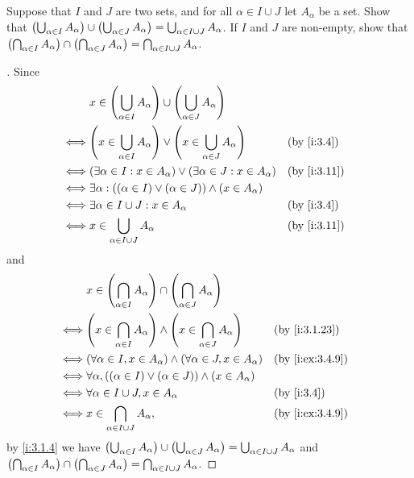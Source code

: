 \begin{ex}\label{i:ex:3.4.10}
  Suppose that \(I\) and \(J\) are two sets, and for all \(\alpha \in I \cup J\) let \(A_\alpha\) be a set.
  Show that \(\left\lparen\bigcup_{\alpha \in I} A_\alpha\right\rparen \cup \left\lparen\bigcup_{\alpha \in J} A_\alpha\right\rparen = \bigcup_{\alpha \in I \cup J} A_\alpha\).
  If \(I\) and \(J\) are non-empty, show that \(\left\lparen\bigcap_{\alpha \in I} A_\alpha\right\rparen \cap \left\lparen\bigcap_{\alpha \in J} A_\alpha\right\rparen = \bigcap_{\alpha \in I \cup J} A_\alpha\).
\end{ex}

\begin{proof}[]
  Since
  \begin{align*}
         & x \in \pa{\bigcup_{\alpha \in I} A_\alpha} \cup \pa{\bigcup_{\alpha \in J} A_\alpha}                        \\
    \iff & \pa{x \in \bigcup_{\alpha \in I} A_\alpha} \lor \pa{x \in \bigcup_{\alpha \in J} A_\alpha} &  & \by{i:3.4}  \\
    \iff & (\exists \alpha \in I : x \in A_\alpha) \lor (\exists \alpha \in J : x \in A_\alpha)       &  & \by{i:3.11} \\
    \iff & \exists \alpha : ((\alpha \in I) \lor (\alpha \in J)) \land (x \in A_\alpha)                                \\
    \iff & \exists \alpha \in I \cup J : x \in A_\alpha                                               &  & \by{i:3.4}  \\
    \iff & x \in \bigcup_{\alpha \in I \cup J} A_\alpha                                               &  & \by{i:3.11}
  \end{align*}
  and
  \begin{align*}
         & x \in \pa{\bigcap_{\alpha \in I} A_\alpha} \cap \pa{\bigcap_{\alpha \in J} A_\alpha}                             \\
    \iff & \pa{x \in \bigcap_{\alpha \in I} A_\alpha} \land \pa{x \in \bigcap_{\alpha \in J} A_\alpha} &  & \by{i:3.1.23}   \\
    \iff & (\forall \alpha \in I, x \in A_\alpha) \land (\forall \alpha \in J, x \in A_\alpha)         &  & \by{i:ex:3.4.9} \\
    \iff & \forall \alpha, ((\alpha \in I) \lor (\alpha \in J)) \land (x \in A_\alpha)                                      \\
    \iff & \forall \alpha \in I \cup J, x \in A_\alpha                                                 &  & \by{i:3.4}      \\
    \iff & x \in \bigcap_{\alpha \in I \cup J} A_\alpha,                                               &  & \by{i:ex:3.4.9}
  \end{align*}
  by \cref{i:3.1.4} we have \(\left\lparen\bigcup_{\alpha \in I} A_\alpha\right\rparen \cup \left\lparen\bigcup_{\alpha \in J} A_\alpha\right\rparen = \bigcup_{\alpha \in I \cup J} A_\alpha\) and \(\left\lparen\bigcap_{\alpha \in I} A_\alpha\right\rparen \cap \left\lparen\bigcap_{\alpha \in J} A_\alpha\right\rparen = \bigcap_{\alpha \in I \cup J} A_\alpha\).
\end{proof}

